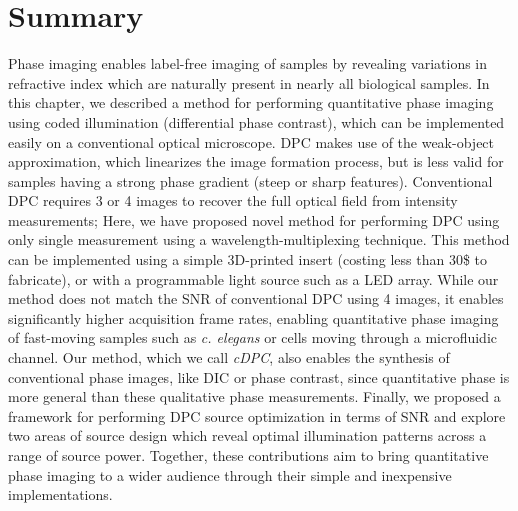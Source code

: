 \section{Summary}
Phase imaging enables label-free imaging of samples by revealing variations in refractive index which are naturally present in nearly all biological samples. In this chapter, we described a method for performing quantitative phase imaging using coded illumination (differential phase contrast), which can be implemented easily on a conventional optical microscope. DPC makes use of the weak-object approximation, which linearizes the image formation process, but is less valid for samples having a strong phase gradient (steep or sharp features). Conventional DPC requires 3 or 4 images to recover the full optical field from intensity measurements; Here, we have proposed novel method for performing DPC using only single measurement using a wavelength-multiplexing technique. This method can be implemented using a simple 3D-printed insert (costing less than 30\$ to fabricate), or with a programmable light source such as a LED array. While our method does not match the SNR of conventional DPC using 4 images, it enables significantly higher acquisition frame rates, enabling quantitative phase imaging of fast-moving samples such as \textit{c. elegans} or cells moving through a microfluidic channel. Our method, which we call \textit{cDPC}, also enables the synthesis of conventional phase images, like DIC or phase contrast, since quantitative phase is more general than these qualitative phase measurements. Finally, we proposed a framework for performing DPC source optimization in terms of SNR and explore two areas of source design which reveal optimal illumination patterns across a range of source power. Together, these contributions aim to bring quantitative phase imaging to a wider audience through their simple and inexpensive implementations.
